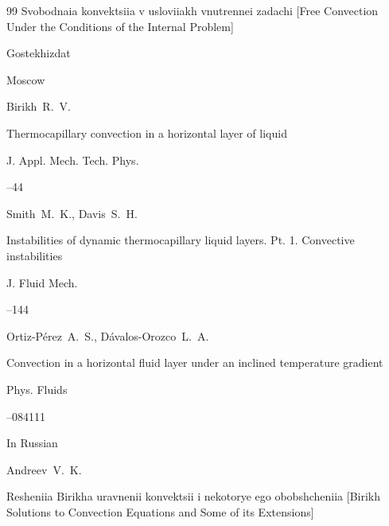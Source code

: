 \begin{thebibliography}{99}
\book Svobodnaia konvektsiia v usloviiakh vnutrennei zadachi \rm [Free Convection Under the Conditions of the Internal Problem]


\publ Gostekhizdat

\publaddr Moscow







\by Birikh~R.~V.

\paper Thermocapillary convection in a horizontal layer of liquid

\jour J. Appl. Mech. Tech. Phys.




–44 






\by Smith~M.~K., Davis~S.~H.

\paper Instabilities of dynamic thermocapillary liquid layers. Pt. 1. Convective instabilities

\jour J. Fluid Mech.



--144





\by Ortiz-P\'{e}rez~A.~S., D\'{a}valos-Orozco~L.~A.

\paper Convection in a horizontal fluid layer under an inclined temperature gradient

\jour Phys. Fluids




–084111







\lang In Russian

\by Andreev~V.~K.

\book Resheniia Birikha uravnenii konvektsii i nekotorye ego obobshcheniia \rm [Birikh Solutions to Convection Equations and Some of its Extensions]


\end{thebibliography}
